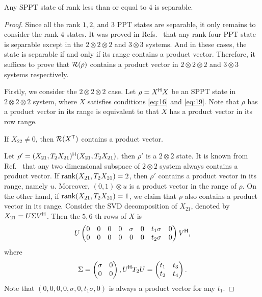 \begin{thm}
Any SPPT state of rank less than or equal to 4 is separable.
\end{thm}
\begin{proof}
  Since all the rank $1,2$, and $3$ PPT states are separable, it only  remains to consider the  rank $4$ states.
  It was proved in Refs.~\cite{Chen2011,Chen2013a} that  any rank four PPT state is   separable  
  except in the $2\otimes 2\otimes 2$ and $3\otimes 3$ systems. And in these cases, the state is separable if and only
  if its range  contains a product vector.
  Therefore, it suffices to prove that $\mathcal{R} (\rho)$ contains a product vector in 
  $2\otimes 2 \otimes 2$ and $3\otimes 3$ systems respectively. 
  
  Firstly, we consider the $2\otimes 2\otimes 2$ case.  Let $\rho=X^{\mathsf{H}} X$ be an SPPT state in $2\otimes 2 \otimes 2$
  system, where $X$ satisfies conditions  \eqref{eq:16} and \eqref{eq:19}.  Note
  that $\rho$ has a product vector in its range is equivalent to that $X$ has a product vector in its row range.

  If $X_{22}\neq 0$, then $\mathcal{R} (X^{\mathsf{T}})$ contains a  product vector.

 

  Let $\rho'=(X_{21},T_2X_{21}) ^{\mathsf{H}}(X_{21},T_2X_{21})$, then $\rho'$ is a $2\otimes 2$ state. It is known from
  Ref.~\cite{Sanpera1997} that any two dimensional subspace of $2\otimes 2$ system  always contains a product
  vector. If $\mathrm{rank} (X_{21},T_2X_{21}) = 2$, then $\rho'$ contains a product vector in its range, namely $u$. Moreover,
  $(0,1)\otimes u$ is a product  vector in the range of $\rho$. On the other hand, if
  $\mathrm{rank} (X_{21},T_2X_{21}) = 1$, we claim that $\rho$ also contains a product vector in its range. Consider  the SVD
  decomposition of $X_{21}$, denoted by $X_{21} = U\Sigma V^{\mathsf{H}}$. Then the
  $5,6$-th rows of $X$ is
  \begin{equation*}
    U
    \begin{pmatrix}
     0&0& 0 & 0 & \sigma & 0 & t_1\sigma & 0 \\
     0&0& 0 & 0 & 0      & 0 & t_2\sigma & 0 \\
    \end{pmatrix}V^{\mathsf{H}},
  \end{equation*}
  where
  \begin{equation*}
    \Sigma =
    \begin{pmatrix}
      \sigma & 0 \\
      0 & 0
    \end{pmatrix}, U^{\mathsf{H}} T_2 U =
    \begin{pmatrix}
      t_1& t_3\\
      t_2 & t_4
    \end{pmatrix}.
  \end{equation*}
  Note that  $( 0 , 0,0,0 , \sigma, 0 , t_1\sigma , 0)$ is always a product vector for any $t_1$.
  

\end{proof}
